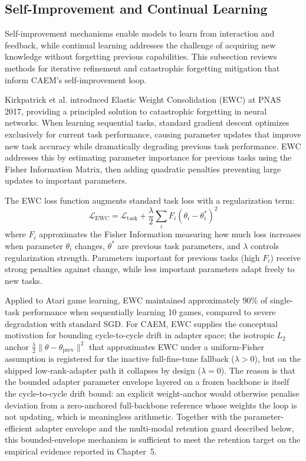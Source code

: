 \subsection{Self-Improvement and Continual Learning}
\label{sec:lit-self-improvement}

Self-improvement mechanisms enable models to learn from interaction and feedback, while continual learning addresses the challenge of acquiring new knowledge without forgetting previous capabilities. This subsection reviews methods for iterative refinement and catastrophic forgetting mitigation that inform CAEM's self-improvement loop.

Kirkpatrick et al. \cite{doi:10.1073/pnas.1611835114} introduced Elastic Weight Consolidation (EWC) at PNAS 2017, providing a principled solution to catastrophic forgetting in neural networks. When learning sequential tasks, standard gradient descent optimizes exclusively for current task performance, causing parameter updates that improve new task accuracy while dramatically degrading previous task performance. EWC addresses this by estimating parameter importance for previous tasks using the Fisher Information Matrix, then adding quadratic penalties preventing large updates to important parameters.

The EWC loss function augments standard task loss with a regularization term:
\begin{equation}
\mathcal{L}_{\text{EWC}} = \mathcal{L}_{\text{task}} + \frac{\lambda}{2} \sum_{i} F_i (\theta_i - \theta_i^*)^2
\end{equation}
where $F_i$ approximates the Fisher Information measuring how much loss increases when parameter $\theta_i$ changes, $\theta^*$ are previous task parameters, and $\lambda$ controls regularization strength. Parameters important for previous tasks (high $F_i$) receive strong penalties against change, while less important parameters adapt freely to new tasks.

Applied to Atari game learning, EWC maintained approximately 90\% of single-task performance when sequentially learning 10 games, compared to severe degradation with standard SGD. For CAEM, EWC supplies the conceptual motivation for bounding cycle-to-cycle drift in adapter space; the isotropic $L_{2}$ anchor $\frac{\lambda}{2}\lVert \theta - \theta_{\text{prev}} \rVert^{2}$ that approximates EWC under a uniform-Fisher assumption is registered for the inactive full-fine-tune fallback ($\lambda > 0$), but on the shipped low-rank-adapter path it collapses by design ($\lambda = 0$). The reason is that the bounded adapter parameter envelope layered on a frozen backbone is itself the cycle-to-cycle drift bound: an explicit weight-anchor would otherwise penalise deviation from a zero-anchored full-backbone reference whose weights the loop is not updating, which is meaningless arithmetic. Together with the parameter-efficient adapter envelope and the multi-modal retention guard described below, this bounded-envelope mechanism is sufficient to meet the retention target on the empirical evidence reported in Chapter~5.

